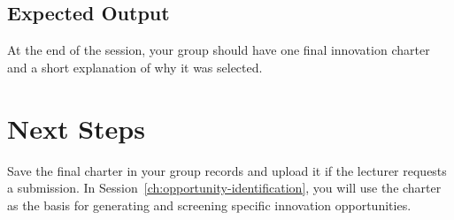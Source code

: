 \subsection{Expected Output}

At the end of the session, your group should have one final innovation charter and a short explanation of why it was selected.

\section{Next Steps}

Save the final charter in your group records and upload it if the lecturer requests a submission. In Session~\ref{ch:opportunity-identification}, you will use the charter as the basis for generating and screening specific innovation opportunities.
